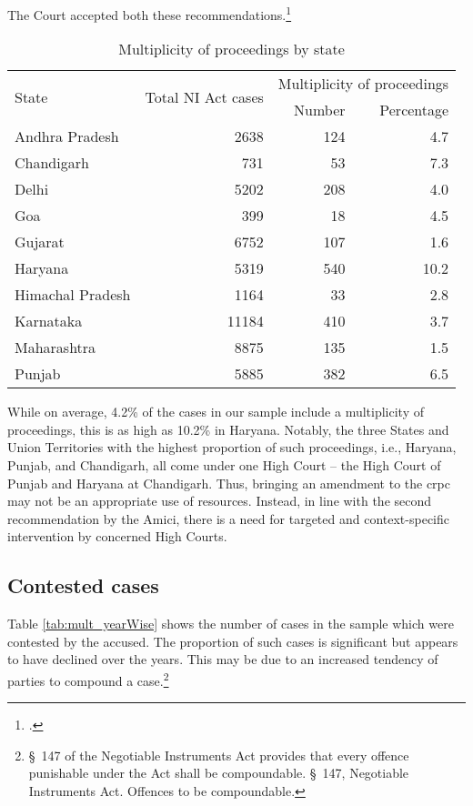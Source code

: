 The Court accepted both these recommendations.\footcite{sc2020_138}

\begin{longtable}[h!]{@{}lrrr@{}}
 \caption{Multiplicity of proceedings by state}\label{tab:state_multiplicity}\\
\toprule
\multirow{2}{*}{State} & \multirow{2}{*}{Total NI Act cases} & \multicolumn{2}{c}{Multiplicity of proceedings} \\
\cmidrule{3-4}
 & & Number & Percentage \\
\midrule
\endhead
Andhra Pradesh & 2638 & 124 & 4.7 \\
Chandigarh & 731 & 53 & 7.3 \\
Delhi & 5202 & 208 & 4.0 \\
Goa & 399 & 18 & 4.5 \\
Gujarat & 6752 & 107 & 1.6 \\
Haryana & 5319 & 540 & 10.2 \\
Himachal Pradesh & 1164 & 33 & 2.8 \\
Karnataka & 11184 & 410 & 3.7 \\
Maharashtra & 8875 & 135 & 1.5 \\
Punjab & 5885 & 382 & 6.5 \\
\bottomrule
\end{longtable}

While on average, 4.2\% of the cases in our sample include a multiplicity of proceedings, this is as high as 10.2\% in Haryana. Notably, the three States and Union Territories with the highest proportion of such proceedings, i.e., Haryana, Punjab, and Chandigarh, all come under one High Court -- the High Court of Punjab and Haryana at Chandigarh. Thus, bringing an amendment to the \gls{crpc} may not be an appropriate use of resources. Instead, in line with the second recommendation by the Amici, there is a need for targeted and context-specific intervention by concerned High Courts.

\subsection{Contested cases}
\label{sec:contested-cases}

Table \ref{tab:mult_yearWise} shows the number of cases in the sample which were contested by the accused. The proportion of such cases is significant but appears to have declined over the years. This may be due to an increased tendency of parties to compound a case.\footnote{\S~147 of the Negotiable Instruments Act provides that every offence punishable under the Act shall be compoundable. \S~147, Negotiable Instruments Act. Offences to be compoundable.}

